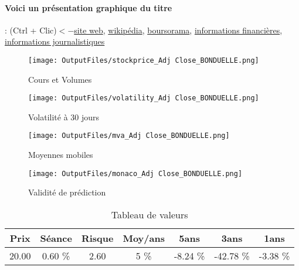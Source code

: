 \documentclass[11pt,a4paper]{report}%
\begin{document}
\paragraph{Voici un présentation graphique du titre} : (Ctrl + Clic)$<-$\href{http://www.bonduelle.com/}{site web}, \href{https://fr.wikipedia.org/wiki/Bonduelle}{wikipédia}, \href{https://www.boursorama.com/cours/1rPBON}{boursorama}, \href{https://www.qwant.com/?q=site:https:%2f%2fwww.easybourse.com%2faction-societe%2fBONDUELLE&t=web&client=ext-firefox-hp}{informations financières}, \href{https://bourse.lerevenu.com/cours-de-bourse/fiche-valeur-synthese/BONDUELLE/BON-FR}{informations journalistiques}
\begin{figure}[!htb]
   \begin{minipage}{0.5\textwidth}
     \centering
     \texttt{[image: OutputFiles/stockprice\_Adj Close\_BONDUELLE.png]}
     \caption{Cours et Volumes}\label{Fig:price_BONDUELLE}
   \end{minipage}\hfill
   \begin{minipage}{0.5\textwidth}
     \centering
     \texttt{[image: OutputFiles/volatility\_Adj Close\_BONDUELLE.png]}
     \caption{Volatilité à 30 jours}\label{Fig:volat_BONDUELLE}
   \end{minipage}
\end{figure}
\begin{figure}[!htb]
   \begin{minipage}{0.5\textwidth}
     \centering
     \texttt{[image: OutputFiles/mva\_Adj Close\_BONDUELLE.png]}
     \caption{Moyennes mobiles}\label{Fig:mva_BONDUELLE}
   \end{minipage}\hfill
   \begin{minipage}{0.5\textwidth}
     \centering
     \texttt{[image: OutputFiles/monaco\_Adj Close\_BONDUELLE.png]}
     \caption{Validité de prédiction}\label{Fig:prediction_BONDUELLE}
   \end{minipage}
\end{figure}

\begin{table}[H]
  \centering
    \begin{tabular}{|c|c|c|c|c|c|c|}
    \hline
    Prix & Séance & Risque  & Moy/ans & 5ans & 3ans & 1ans \\
    \hline
    20.00 &    0.60 \%    & 2.60 & 5 \% & -8.24 \% & -42.78 \% & -3.38 \% \\
    \hline
    \end{tabular}%
        \label{tab:table_BONDUELLE}%
      \caption{Tableau de valeurs}
\end{table}%
\end{document}
